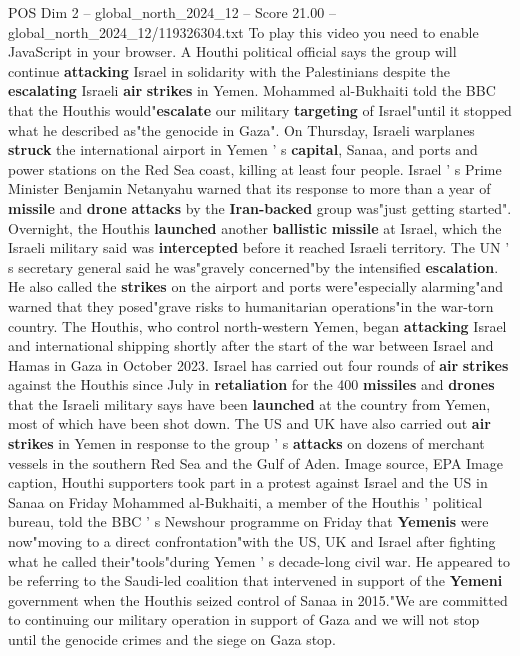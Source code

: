 \begin{textsample}{POS Dim 2 – global\_north\_2024\_12 – Score 21.00 – global\_north\_2024\_12/119326304.txt}  \label{ex:f2_pos_274}
To play this video you need to enable JavaScript in your browser.
A Houthi political official says the group will continue \textbf{attacking} Israel in solidarity with the Palestinians despite the \textbf{escalating} Israeli \textbf{air} \textbf{strikes} in Yemen.
Mohammed al-Bukhaiti told the BBC that the Houthis would"\textbf{escalate} our military \textbf{targeting} of Israel"until it stopped what he described as"the genocide in Gaza".
On Thursday, Israeli warplanes \textbf{struck} the international airport in Yemen ' s \textbf{capital}, Sanaa, and ports and power stations on the Red Sea coast, killing at least four people.
Israel ' s Prime Minister Benjamin Netanyahu warned that its response to more than a year of \textbf{missile} and \textbf{drone} \textbf{attacks} by the \textbf{Iran-backed} group was"just getting started".
Overnight, the Houthis \textbf{launched} another \textbf{ballistic} \textbf{missile} at Israel, which the Israeli military said was \textbf{intercepted} before it reached Israeli territory.
The UN ' s secretary general said he was"gravely concerned"by the intensified \textbf{escalation}.
He also called the \textbf{strikes} on the airport and ports were"especially alarming"and warned that they posed"grave risks to humanitarian operations"in the war-torn country.
The Houthis, who control north-western Yemen, began \textbf{attacking} Israel and international shipping shortly after the start of the war between Israel and Hamas in Gaza in October 2023.
Israel has carried out four rounds of \textbf{air} \textbf{strikes} against the Houthis since July in \textbf{retaliation} for the 400 \textbf{missiles} and \textbf{drones} that the Israeli military says have been \textbf{launched} at the country from Yemen, most of which have been shot down.
The US and UK have also carried out \textbf{air} \textbf{strikes} in Yemen in response to the group ' s \textbf{attacks} on dozens of merchant vessels in the southern Red Sea and the Gulf of Aden.
Image source, EPA Image caption, Houthi supporters took part in a protest against Israel and the US in Sanaa on Friday Mohammed al-Bukhaiti, a member of the Houthis ' political bureau, told the BBC ' s Newshour programme on Friday that \textbf{Yemenis} were now"moving to a direct confrontation"with the US, UK and Israel after fighting what he called their"tools"during Yemen ' s decade-long civil war.
He appeared to be referring to the Saudi-led coalition that intervened in support of the \textbf{Yemeni} government when the Houthis seized control of Sanaa in 2015."We are committed to continuing our military operation in support of Gaza and we will not stop until the genocide crimes and the siege on Gaza stop.

\end{textsample}
